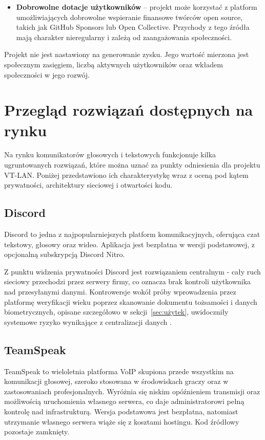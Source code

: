 \begin{itemize}
	\item \textbf{Dobrowolne dotacje użytkowników} -- projekt może korzystać
	z platform umożliwiających dobrowolne wspieranie finansowe twórców
	open source, takich jak GitHub Sponsors lub Open Collective.
	Przychody z tego źródła mają charakter nieregularny i zależą
	od zaangażowania społeczności.
\end{itemize}

Projekt nie jest nastawiony na generowanie zysku. Jego wartość mierzona jest
społecznym zasięgiem, liczbą aktywnych użytkowników oraz wkładem społeczności
w jego rozwój.

\section{Przegląd rozwiązań dostępnych na rynku}
\label{sec:przeglad_rynku}

Na rynku komunikatorów głosowych i tekstowych funkcjonuje kilka ugruntowanych
rozwiązań, które można uznać za punkty odniesienia dla projektu VT-LAN.
Poniżej przedstawiono ich charakterystykę wraz z oceną pod kątem prywatności,
architektury sieciowej i otwartości kodu.

\subsection*{Discord}

Discord \cite{Discord} to jedna z najpopularniejszych platform komunikacyjnych,
oferująca czat tekstowy, głosowy oraz wideo. Aplikacja jest
bezpłatna w wersji podstawowej, z opcjonalną subskrypcją Discord Nitro.

Z punktu widzenia prywatności Discord jest rozwiązaniem centralnym - cały
ruch sieciowy przechodzi przez serwery firmy, co oznacza brak kontroli
użytkownika nad przesyłanymi danymi. Kontrowersje wokół próby wprowadzenia
przez platformę weryfikacji wieku poprzez skanowanie dokumentu tożsamości
i danych biometrycznych, opisane szczegółowo w sekcji~\ref{sec:użytek},
uwidoczniły systemowe ryzyko wynikające z centralizacji danych
\cite{DiscordPostpone}.

\subsection*{TeamSpeak}

TeamSpeak \cite{TeamSpeak} to wieloletnia platforma VoIP skupiona przede
wszystkim na komunikacji głosowej, szeroko stosowana w środowiskach graczy
oraz w zastosowaniach profesjonalnych. Wyróżnia się niskim opóźnieniem
transmisji oraz możliwością uruchomienia własnego serwera, co daje
administratorowi pełną kontrolę nad infrastrukturą. Wersja podstawowa
jest bezpłatna, natomiast utrzymanie własnego serwera wiąże się z kosztami
hostingu. Kod źródłowy pozostaje zamknięty.

